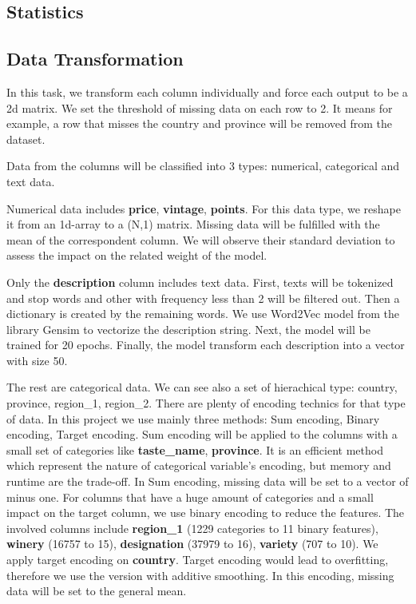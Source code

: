 \documentclass[11pt]{article}
\begin{document}
\subsection{Statistics}



\subsection{Data Transformation}

In this task, we transform each column individually and force each output to be a 2d matrix. We set the threshold of missing data on each row to 2. It means for example, a row that misses the country and province will be removed from the dataset.

Data from the columns will be classified into 3 types: numerical, categorical and text data.

Numerical data includes \textbf{price}, \textbf{vintage}, \textbf{points}. For this data type, we reshape it from an 1d-array to a (N,1) matrix. Missing data will be fulfilled with the mean of the correspondent column. We will observe their standard deviation to assess the impact on the related weight of the model.

Only the \textbf{description} column includes text data. First, texts will be tokenized and stop words and other with frequency less than 2 will be filtered out. Then a dictionary is created by the remaining words. We use Word2Vec model from the library Gensim to vectorize the description string. Next, the model will be trained for 20 epochs. Finally, the model transform each description into a vector with size 50.

The rest are categorical data. We can see also a set of hierachical type: {country, province, region_1, region_2}. There are plenty of encoding technics for that type of data. In this project we use mainly three methods: Sum encoding, Binary encoding, Target encoding. Sum encoding will be applied to the columns with a small set of categories like \textbf{taste_name}, \textbf{province}. It is an efficient method which represent the nature of categorical variable's encoding, but memory and runtime are the trade-off. In Sum encoding, missing data will be set to a vector of minus one. For columns that have a huge amount of categories and a small impact on the target column, we use binary encoding to reduce the features. The involved columns include \textbf{region_1} (1229 categories to 11 binary features), \textbf{winery} (16757 to 15), \textbf{designation} (37979 to 16), \textbf{variety} (707 to 10). We apply target encoding on \textbf{country}. Target encoding would lead to overfitting, therefore we use the version with additive smoothing. In this encoding, missing data will be set to the general mean.
\end{document}

